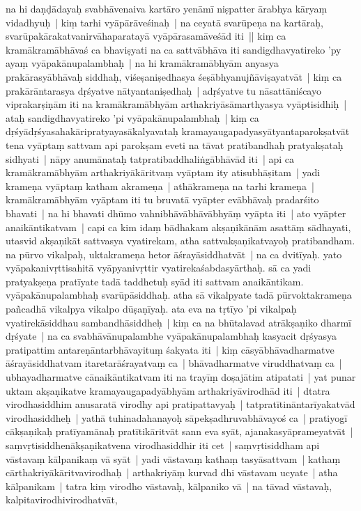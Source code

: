 \documentclass[article,12pt,a4paper]{memoir}%
\begin{document}
na hi daṇḍādayaḥ svabhāvenaiva kartāro yenāmī niṣpatter ārabhya kāryaṃ vidadhyuḥ | kiṃ tarhi vyāpārāveśinaḥ | na ceyatā svarūpeṇa na kartāraḥ, svarūpakārakatvanirvāhaparatayā vyāpārasamāveśād iti || \label{thakur75-86.17} kiṃ ca kramākramābhāvaś ca bhaviṣyati na ca sattvābhāva iti sandigdhavyatireko 'py ayaṃ vyāpakānupalambhaḥ | na hi kramākramābhyām anyasya prakārasyābhāvaḥ siddhaḥ, viśeṣaniṣedhasya śeṣābhyanujñāviṣayatvāt | \label{thakur75-86.20} kiṃ ca prakārāntarasya dṛśyatve nātyantaniṣedhaḥ | adṛśyatve tu nāsattāniścayo viprakarṣiṇām iti na kramākramābhyām arthakriyāsāmarthyasya vyāptisidhiḥ | ataḥ sandigdhavyatireko 'pi vyāpakānupalambhaḥ | \label{thakur75-86.23} kiṃ ca dṛśyādṛśyasahakāripratyayasākalyavataḥ kramayaugapadyasyātyantaparokṣatvāt tena vyāptaṃ sattvam api parokṣam eveti na tāvat pratibandhaḥ pratyakṣataḥ sidhyati | nāpy anumānataḥ tatpratibaddhaliṅgābhāvād iti | \label{thakur75-86.26} api ca kramākramābhyām arthakriyākāritvaṃ vyāptam ity atisubhāṣitam | yadi krameṇa vyāptaṃ katham akrameṇa | athākrameṇa na tarhi krameṇa | kramākramābhyām vyāptam iti tu bruvatā vyāpter evābhāvaḥ pradarśito bhavati | na hi bhavati dhūmo vahnibhāvābhāvābhyāṃ vyāpta iti | ato vyāpter anaikāntikatvam | \label{thakur75-86.30} capi ca kim idaṃ bādhakam akṣaṇikānām asattāṃ sādhayati, utasvid akṣaṇikāt sattvasya vyatirekam, atha sattvakṣaṇikatvayoḥ pratibandham. \label{thakur75-86.31} na pūrvo vikalpaḥ, uktakrameṇa hetor āśrayāsiddhatvāt | \label{thakur75-87.1} na ca dvitīyaḥ. yato vyāpakanivṛttisahitā vyāpyanivṛttir vyatirekaśabdasyārthaḥ. sā ca yadi pratyakṣeṇa pratīyate tadā taddhetuḥ syād iti sattvam anaikāntikam. vyāpakānupalambhaḥ svarūpāsiddhaḥ. atha sā vikalpyate tadā pūrvoktakrameṇa pañcadhā vikalpya vikalpo dūṣaṇīyaḥ. \label{thakur75-87.4} ata eva na tṛtīyo 'pi vikalpaḥ vyatirekāsiddhau sambandhāsiddheḥ | \label{thakur75-87.6} kiṃ ca na bhūtalavad atrākṣaṇiko dharmī dṛśyate | na ca svabhāvānupalambhe vyāpakānupalambhaḥ kasyacit dṛśyasya pratipattim antareṇāntarbhāvayituṃ śakyata iti | \label{thakur75-87.9} kiṃ cāsyābhāvadharmatve āśrayāsiddhatvam itaretarāśrayatvaṃ ca | bhāvadharmatve viruddhatvaṃ ca | ubhayadharmatve cānaikāntikatvam iti na trayīṃ doṣajātim atipatati | \label{thakur75-87.11} yat punar uktam akṣaṇikatve kramayaugapadyābhyām arthakriyāvirodhād iti | dtatra virodhasiddhim anusaratā virodhy api pratipattavyaḥ | tatpratītināntarīyakatvād virodhasiddheḥ | yathā tuhinadahanayoḥ sāpekṣadhruvabhāvayoś ca | \label{thakur75-87.13} pratiyogī cākṣaṇikaḥ pratīyamānaḥ pratītikāritvāt sann eva syāt, ajanakasyāprameyatvāt | \label{thakur75-87.15} saṃvṛtisiddhenākṣaṇikatvena virodhasiddhir iti cet | saṃvṛtisiddham api vāstavaṃ kālpanikaṃ vā syāt | \label{thakur75-87.17} yadi vāstavaṃ kathaṃ tasyāsattvam | kathaṃ cārthakriyākāritvavirodhaḥ | arthakriyāṃ kurvad dhi vāstavam ucyate | \label{thakur75-87.19} atha kālpanikam | tatra kiṃ virodho vāstavaḥ, kālpaniko vā | na tāvad vāstavaḥ, kalpitavirodhivirodhatvāt, 
\end{document}
